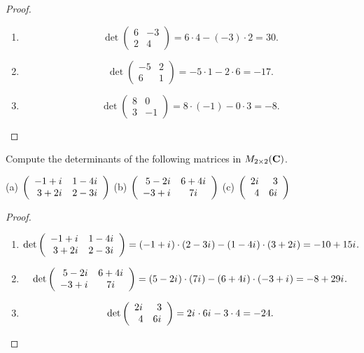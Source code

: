 \begin{proof} \ 

\begin{enumerate}
\item
\[
    \det \left(\begin{array}{rr} 6 & -3 \\ 2 & 4 \end{array}\right) = 6 \cdot 4 - (-3) \cdot 2 = 30.
\]
\item
\[
    \det \left(\begin{array}{rr} -5 & 2 \\ 6 & 1 \end{array}\right) = -5 \cdot 1 - 2 \cdot 6 = -17.
\]
\item
\[
    \det \left(\begin{array}{rr} 8 & 0 \\ 3 & -1 \end{array}\right) = 8 \cdot (-1) - 0 \cdot 3 = -8.
\]
\end{enumerate}
\end{proof}

\begin{exercise} \label{exercise 4.1.3}
Compute the determinants of the following matrices in  \(M_{2 \times 2}(\mathbf{C})\).

(a) \(\left(\begin{array}{rr} -1 + {i\mkern1mu} & 1 - 4{i\mkern1mu} \\ 3 + 2{i\mkern1mu} & 2 - 3{i\mkern1mu} \end{array}\right)\)
(b) \(\left(\begin{array}{rc} 5 - 2{i\mkern1mu} & 6 + 4{i\mkern1mu} \\ -3 + {i\mkern1mu} & 7{i\mkern1mu} \end{array}\right)\)
(c) \(\left(\begin{array}{rr} 2{i\mkern1mu} & 3 \\ 4 & 6{i\mkern1mu} \end{array}\right)\)
\end{exercise}

\begin{proof} \ 

\begin{enumerate}
\item
\[
    \det \left(\begin{array}{rr} -1 + {i\mkern1mu} & 1 - 4{i\mkern1mu} \\ 3 + 2{i\mkern1mu} & 2 - 3{i\mkern1mu} \end{array}\right)
    = (-1 + {i\mkern1mu}) \cdot (2 - 3{i\mkern1mu}) - (1 - 4{i\mkern1mu}) \cdot (3 + 2{i\mkern1mu})
    = -10 + 15{i\mkern1mu}.
\]
\item
\[
    \det \left(\begin{array}{rc} 5 - 2{i\mkern1mu} & 6 + 4{i\mkern1mu} \\ -3 + {i\mkern1mu} & 7{i\mkern1mu} \end{array}\right)
    = (5 - 2{i\mkern1mu}) \cdot (7{i\mkern1mu}) - (6 + 4{i\mkern1mu}) \cdot (-3 + {i\mkern1mu})
    = -8 + 29{i\mkern1mu}.
\]
\item
\[
    \det \left(\begin{array}{rr} 2{i\mkern1mu} & 3 \\ 4 & 6{i\mkern1mu} \end{array}\right)
    = 2{i\mkern1mu} \cdot 6{i\mkern1mu} - 3 \cdot 4
    = -24.
\]
\end{enumerate}
\end{proof}


